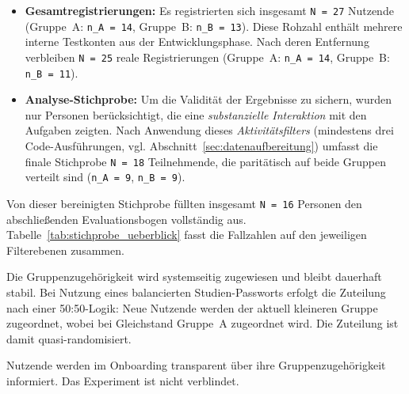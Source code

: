 \begin{itemize}
    \item \textbf{Gesamtregistrierungen:} Es registrierten sich insgesamt \texttt{N = 27} Nutzende (Gruppe~A: \texttt{n\_A = 14}, Gruppe~B: \texttt{n\_B = 13}). Diese Rohzahl enthält mehrere interne Testkonten aus der Entwicklungsphase. Nach deren Entfernung verbleiben \texttt{N = 25} reale Registrierungen (Gruppe~A: \texttt{n\_A = 14}, Gruppe~B: \texttt{n\_B = 11}).
    \item \textbf{Analyse-Stichprobe:} Um die Validität der Ergebnisse zu sichern, wurden nur Personen berücksichtigt, die eine \textit{substanzielle Interaktion} mit den Aufgaben zeigten. Nach Anwendung dieses \textit{Aktivitätsfilters} (mindestens drei Code-Ausführungen, vgl. Abschnitt~\ref{sec:datenaufbereitung}) umfasst die finale Stichprobe \texttt{N = 18} Teilnehmende, die paritätisch auf beide Gruppen verteilt sind (\texttt{n\_A = 9}, \texttt{n\_B = 9}).
\end{itemize}

Von dieser bereinigten Stichprobe füllten insgesamt \texttt{N = 16} Personen den abschließenden Evaluationsbogen vollständig aus. Tabelle~\ref{tab:stichprobe_ueberblick} fasst die Fallzahlen auf den jeweiligen Filterebenen zusammen.

Die Gruppenzugehörigkeit wird systemseitig zugewiesen und bleibt dauerhaft stabil. Bei Nutzung eines balancierten Studien-Passworts erfolgt die Zuteilung nach einer 50:50-Logik: Neue Nutzende werden der aktuell kleineren Gruppe zugeordnet, wobei bei Gleichstand Gruppe~A zugeordnet wird. Die Zuteilung ist damit quasi-randomisiert.

Nutzende werden im Onboarding transparent über ihre Gruppenzugehörigkeit informiert. Das Experiment ist nicht verblindet.

